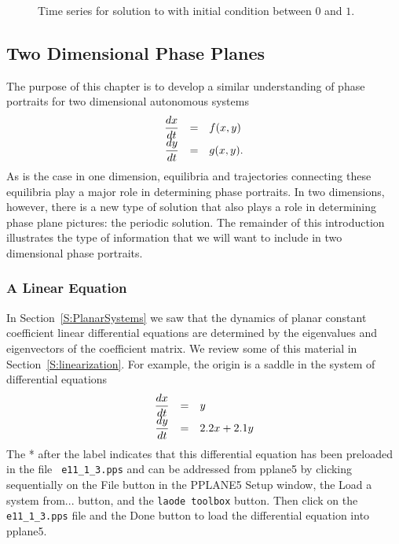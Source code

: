 \documentclass{ximera}
\begin{document}
\begin{figure}[htb]
           \centerline{%
            }
           \caption{Time series for solution to \protect{}
	with initial condition between $0$ and $1$.}
           \label{F:pp1dt}
\end{figure}





\subsection*{Two Dimensional Phase Planes}

The purpose of this chapter is to develop a similar understanding 
of phase portraits for two dimensional autonomous systems
\arraystart
\begin{equation} \label{e:nonlinear2}
\begin{array}{rcl} 
\displaystyle\frac{dx}{dt} & = & f(x,y) \\
\displaystyle\frac{dy}{dt} & = & g(x,y).
\end{array}
\end{equation}
As is the case in one dimension, equilibria and trajectories 
connecting these equilibria play a major role in determining  
phase portraits.  In two dimensions, however, there is a new 
type of solution that also plays a role in determining phase 
plane pictures: the periodic solution.  
The remainder of this 
introduction illustrates the type of information that we will 
want to include in two dimensional phase portraits. 

\subsubsection*{A Linear Equation}

In Section~\ref{S:PlanarSystems} we saw that the dynamics of planar
constant coefficient linear differential equations are determined by the 
eigenvalues and eigenvectors of the coefficient matrix.  We  
review some of this material in Section~\ref{S:linearization}. 
For example, the origin is a saddle
in the system of differential equations
\begin{equation*}  \label{e:localexam}
\begin{array}{rcl} 
\displaystyle\frac{dx}{dt} & = & y \\
\displaystyle\frac{dy}{dt} & = & 2.2x+2.1y 
\end{array}
\end{equation*}
\arrayfinish
{} The * after the label  indicates 
that this differential equation has been preloaded in the file {\tt 
e11\_1\_3.pps} and can be addressed from {\sf pplane5}
 by clicking sequentially on the 
{\sf File} button in the {\sf PPLANE5 Setup} window, the 
{\sf Load a system from...} button, and the {\tt laode toolbox} button.  
Then click on the {\tt e11\_1\_3.pps} file and the {\sf Done} button to 
load the differential equation  into {\sf pplane5}.
\end{document}
